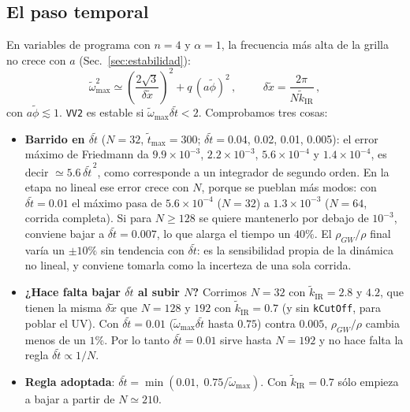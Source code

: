 \documentclass[11pt]{article}
\begin{document}
        \subsection{El paso temporal}
            \label{sec:dt}

            En variables de programa con $n = 4$ y $\alpha = 1$, la frecuencia más alta de la grilla no crece con $a$ (Sec.~\ref{sec:estabilidad}):
            \begin{equation}
                \tilde\omega_{\max}^2 \simeq \left( \frac{2\sqrt 3}{\delta\tilde x} \right)^2 + q \, (a\tilde\phi)^2 \, ,
                \hspace{1cm}
                \delta \tilde x = \frac{2\pi}{N \tilde k_{\text{IR}}} \, ,
            \end{equation}
            con $a\tilde\phi \lesssim 1$. \texttt{VV2} es estable si $\tilde\omega_{\max}\delta\tilde t < 2$. Comprobamos tres cosas:
            \begin{itemize}
                \item \textbf{Barrido en $\delta\tilde t$} ($N = 32$, $\tilde t_{\max} = 300$; $\delta\tilde t = 0.04$, 0.02, 0.01, 0.005): el error máximo de Friedmann da $9.9 \times 10^{-3}$, $2.2 \times 10^{-3}$, $5.6 \times 10^{-4}$ y $1.4 \times 10^{-4}$, es decir $\simeq 5.6\,\delta\tilde t^{\,2}$, como corresponde a un integrador de segundo orden. En la etapa no lineal ese error crece con $N$, porque se pueblan más modos: con $\delta\tilde t = 0.01$ el máximo pasa de $5.6 \times 10^{-4}$ ($N = 32$) a $1.3 \times 10^{-3}$ ($N = 64$, corrida completa). Si para $N \ge 128$ se quiere mantenerlo por debajo de $10^{-3}$, conviene bajar a $\delta\tilde t = 0.007$, lo que alarga el tiempo un $40\%$. El $\rho_{GW}/\rho$ final varía un $\pm 10\%$ sin tendencia con $\delta\tilde t$: es la sensibilidad propia de la dinámica no lineal, y conviene tomarla como la incerteza de una sola corrida.
                \item \textbf{¿Hace falta bajar $\delta\tilde t$ al subir $N$?} Corrimos $N = 32$ con $\tilde k_{\text{IR}} = 2.8$ y $4.2$, que tienen la misma $\delta\tilde x$ que $N = 128$ y $192$ con $\tilde k_{\text{IR}} = 0.7$ (y sin \texttt{kCutOff}, para poblar el UV). Con $\delta\tilde t = 0.01$ ($\tilde\omega_{\max}\delta\tilde t$ hasta $0.75$) contra $0.005$, $\rho_{GW}/\rho$ cambia menos de un $1\%$. Por lo tanto $\delta\tilde t = 0.01$ sirve hasta $N = 192$ y no hace falta la regla $\delta\tilde t \propto 1/N$.
                \item \textbf{Regla adoptada}: $\delta\tilde t = \min(0.01, \; 0.75/\tilde\omega_{\max})$. Con $\tilde k_{\text{IR}} = 0.7$ sólo empieza a bajar a partir de $N \simeq 210$.
            \end{itemize}
\end{document}
